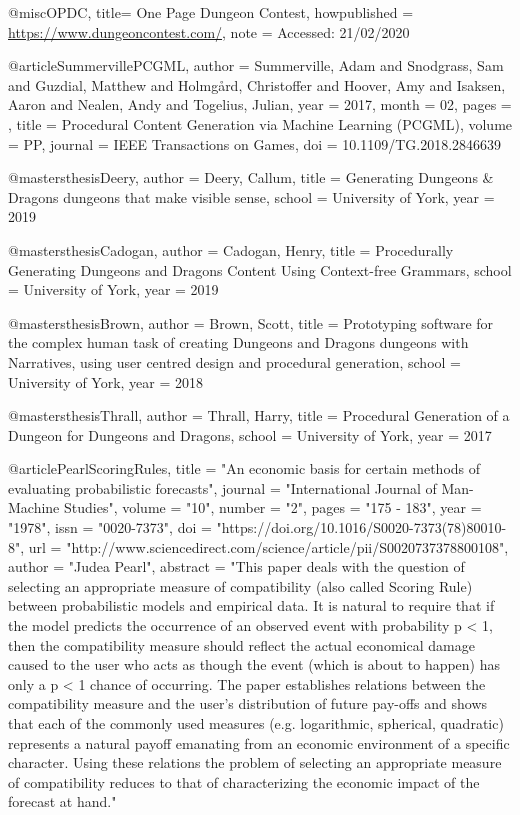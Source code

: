 @misc{OPDC,
title= {One Page Dungeon Contest},
howpublished = {\url{https://www.dungeoncontest.com/}},
note = {Accessed: 21/02/2020}
}

@article{SummervillePCGML,
author = {Summerville, Adam and Snodgrass, Sam and Guzdial, Matthew and Holmgård, Christoffer and Hoover, Amy and Isaksen, Aaron and Nealen, Andy and Togelius, Julian},
year = {2017},
month = {02},
pages = {},
title = {Procedural Content Generation via Machine Learning (PCGML)},
volume = {PP},
journal = {IEEE Transactions on Games},
doi = {10.1109/TG.2018.2846639}
}

@mastersthesis{Deery,
author = {Deery, Callum},
title = {Generating Dungeons \& Dragons dungeons that make visible sense},
school = {University of York},
year = {2019}
}

@mastersthesis{Cadogan,
author = {Cadogan, Henry},
title = {Procedurally Generating Dungeons and Dragons Content Using Context-free Grammars},
school = {University of York},
year = {2019}
}

@mastersthesis{Brown,
author = {Brown, Scott},
title = {Prototyping software for the complex human task of creating Dungeons and Dragons dungeons with Narratives, using user centred design and procedural generation},
school = {University of York},
year = {2018}
}

@mastersthesis{Thrall,
author = {Thrall, Harry},
title = {Procedural Generation of a Dungeon for Dungeons and Dragons},
school = {University of York},
year = {2017}
}


@article{PearlScoringRules,
title = "An economic basis for certain methods of evaluating probabilistic forecasts",
journal = "International Journal of Man-Machine Studies",
volume = "10",
number = "2",
pages = "175 - 183",
year = "1978",
issn = "0020-7373",
doi = "https://doi.org/10.1016/S0020-7373(78)80010-8",
url = "http://www.sciencedirect.com/science/article/pii/S0020737378800108",
author = "Judea Pearl",
abstract = "This paper deals with the question of selecting an appropriate measure of compatibility (also called Scoring Rule) between probabilistic models and empirical data. It is natural to require that if the model predicts the occurrence of an observed event with probability p < 1, then the compatibility measure should reflect the actual economical damage caused to the user who acts as though the event (which is about to happen) has only a p < 1 chance of occurring. The paper establishes relations between the compatibility measure and the user's distribution of future pay-offs and shows that each of the commonly used measures (e.g. logarithmic, spherical, quadratic) represents a natural payoff emanating from an economic environment of a specific character. Using these relations the problem of selecting an appropriate measure of compatibility reduces to that of characterizing the economic impact of the forecast at hand."
}

